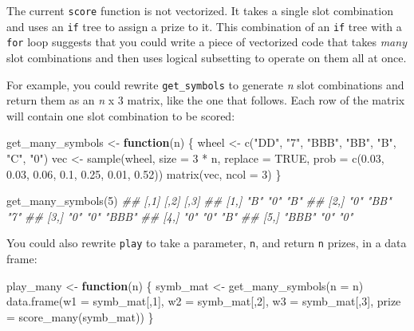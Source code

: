 \documentclass[
  letterpaper,
  DIV=11,
  numbers=noendperiod]{scrbook}
\newenvironment{Shaded}{\begin{snugshade}}{\end{snugshade}}
\newcommand{\AttributeTok}[1]{\textcolor[rgb]{0.40,0.45,0.13}{#1}}
\newcommand{\ConstantTok}[1]{\textcolor[rgb]{0.56,0.35,0.01}{#1}}
\newcommand{\ControlFlowTok}[1]{\textcolor[rgb]{0.00,0.23,0.31}{\textbf{#1}}}
\newcommand{\DecValTok}[1]{\textcolor[rgb]{0.68,0.00,0.00}{#1}}
\newcommand{\DocumentationTok}[1]{\textcolor[rgb]{0.37,0.37,0.37}{\textit{#1}}}
\newcommand{\FloatTok}[1]{\textcolor[rgb]{0.68,0.00,0.00}{#1}}
\newcommand{\FunctionTok}[1]{\textcolor[rgb]{0.28,0.35,0.67}{#1}}
\newcommand{\NormalTok}[1]{\textcolor[rgb]{0.00,0.23,0.31}{#1}}
\newcommand{\OtherTok}[1]{\textcolor[rgb]{0.00,0.23,0.31}{#1}}
\newcommand{\SpecialCharTok}[1]{\textcolor[rgb]{0.37,0.37,0.37}{#1}}
\newcommand{\StringTok}[1]{\textcolor[rgb]{0.13,0.47,0.30}{#1}}
\begin{document}
The current \texttt{score} function is not vectorized. It takes a single
slot combination and uses an \texttt{if} tree to assign a prize to it.
This combination of an \texttt{if} tree with a \texttt{for} loop
suggests that you could write a piece of vectorized code that takes
\emph{many} slot combinations and then uses logical subsetting to
operate on them all at once.

For example, you could rewrite \texttt{get\_symbols} to generate
\emph{n} slot combinations and return them as an \emph{n} x 3 matrix,
like the one that follows. Each row of the matrix will contain one slot
combination to be scored:

\begin{Shaded}
\begin{Highlighting}[]
\NormalTok{get\_many\_symbols }\OtherTok{\textless{}{-}} \ControlFlowTok{function}\NormalTok{(n) \{}
\NormalTok{  wheel }\OtherTok{\textless{}{-}} \FunctionTok{c}\NormalTok{(}\StringTok{"DD"}\NormalTok{, }\StringTok{"7"}\NormalTok{, }\StringTok{"BBB"}\NormalTok{, }\StringTok{"BB"}\NormalTok{, }\StringTok{"B"}\NormalTok{, }\StringTok{"C"}\NormalTok{, }\StringTok{"0"}\NormalTok{)}
\NormalTok{  vec }\OtherTok{\textless{}{-}} \FunctionTok{sample}\NormalTok{(wheel, }\AttributeTok{size =} \DecValTok{3} \SpecialCharTok{*}\NormalTok{ n, }\AttributeTok{replace =} \ConstantTok{TRUE}\NormalTok{,}
    \AttributeTok{prob =} \FunctionTok{c}\NormalTok{(}\FloatTok{0.03}\NormalTok{, }\FloatTok{0.03}\NormalTok{, }\FloatTok{0.06}\NormalTok{, }\FloatTok{0.1}\NormalTok{, }\FloatTok{0.25}\NormalTok{, }\FloatTok{0.01}\NormalTok{, }\FloatTok{0.52}\NormalTok{))}
  \FunctionTok{matrix}\NormalTok{(vec, }\AttributeTok{ncol =} \DecValTok{3}\NormalTok{)}
\NormalTok{\}}

\FunctionTok{get\_many\_symbols}\NormalTok{(}\DecValTok{5}\NormalTok{)}
\DocumentationTok{\#\#      [,1]  [,2] [,3] }
\DocumentationTok{\#\# [1,] "B"   "0"  "B"  }
\DocumentationTok{\#\# [2,] "0"   "BB" "7"  }
\DocumentationTok{\#\# [3,] "0"   "0"  "BBB"}
\DocumentationTok{\#\# [4,] "0"   "0"  "B"  }
\DocumentationTok{\#\# [5,] "BBB" "0"  "0" }
\end{Highlighting}
\end{Shaded}

You could also rewrite \texttt{play} to take a parameter, \texttt{n},
and return \texttt{n} prizes, in a data frame:

\begin{Shaded}
\begin{Highlighting}[]
\NormalTok{play\_many }\OtherTok{\textless{}{-}} \ControlFlowTok{function}\NormalTok{(n) \{}
\NormalTok{  symb\_mat }\OtherTok{\textless{}{-}} \FunctionTok{get\_many\_symbols}\NormalTok{(}\AttributeTok{n =}\NormalTok{ n)}
  \FunctionTok{data.frame}\NormalTok{(}\AttributeTok{w1 =}\NormalTok{ symb\_mat[,}\DecValTok{1}\NormalTok{], }\AttributeTok{w2 =}\NormalTok{ symb\_mat[,}\DecValTok{2}\NormalTok{],}
             \AttributeTok{w3 =}\NormalTok{ symb\_mat[,}\DecValTok{3}\NormalTok{], }\AttributeTok{prize =} \FunctionTok{score\_many}\NormalTok{(symb\_mat))}
\NormalTok{\}}
\end{Highlighting}
\end{Shaded}
\end{document}
